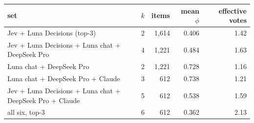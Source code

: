 \begin{tabular}{lrrrr}
\toprule
set & $k$ & items & mean $\phi$ & effective votes \\
\midrule
Jev + Luna Decisions (top-3) & 2 & 1,614 & 0.406 & 1.42 \\
Jev + Luna Decisions + Luna chat + DeepSeek Pro & 4 & 1,221 & 0.484 & 1.63 \\
Luna chat + DeepSeek Pro & 2 & 1,221 & 0.728 & 1.16 \\
Luna chat + DeepSeek Pro + Claude & 3 & 612 & 0.738 & 1.21 \\
Jev + Luna Decisions + Luna chat + DeepSeek Pro + Claude & 5 & 612 & 0.538 & 1.59 \\
all six, top-3 & 6 & 612 & 0.362 & 2.13 \\
\bottomrule
\end{tabular}
